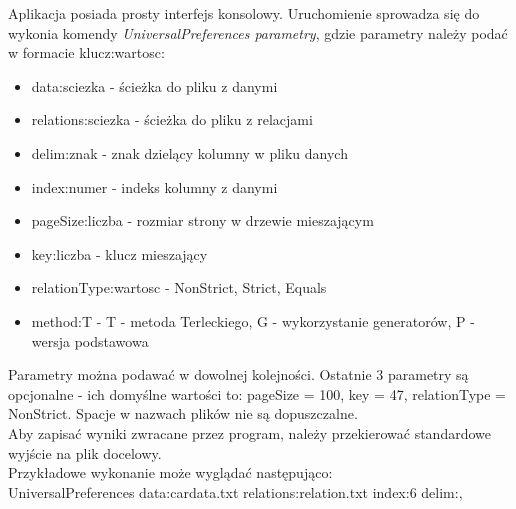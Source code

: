 \documentclass[a4paper,12pt]{article}
\begin{document}
Aplikacja posiada prosty interfejs konsolowy. Uruchomienie sprowadza się do wykonia komendy \textit{UniversalPreferences parametry}, gdzie parametry należy podać w formacie klucz:wartosc:

\begin{itemize}
\item data:sciezka - ścieżka do pliku z danymi
\item relations:sciezka - ścieżka do pliku z relacjami
\item delim:znak - znak dzielący kolumny w pliku danych
\item index:numer - indeks kolumny z danymi
\item pageSize:liczba - rozmiar strony w drzewie mieszającym
\item key:liczba - klucz mieszający
\item relationType:wartosc - {NonStrict, Strict, Equals}
\item method:T - {T - metoda Terleckiego, G - wykorzystanie generatorów, P - wersja podstawowa}
\end{itemize}

Parametry można podawać w dowolnej kolejności. Ostatnie 3 parametry są opcjonalne - ich domyślne wartości to: pageSize = 100, key = 47, relationType = NonStrict. Spacje w nazwach plików nie są dopuszczalne.\\

Aby zapisać wyniki zwracane przez program, należy przekierować standardowe wyjście na plik docelowy.\\

Przykładowe wykonanie może wyglądać następująco:\\

UniversalPreferences data:cardata.txt relations:relation.txt index:6 delim:,




\end{document}
